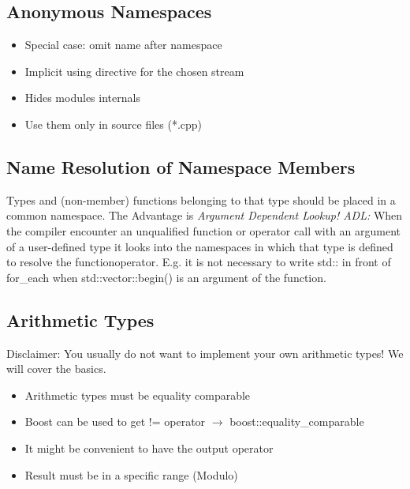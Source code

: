 \subsection{Anonymous Namespaces}
\begin{itemize}
  \itemsep -0.5em 
  \item Special case: omit name after namespace
  \item Implicit using directive for the chosen stream
  \item Hides modules internals
  \item Use them only in source files (*.cpp)
\end{itemize}


\subsection{Name Resolution of Namespace Members}
Types and (non-member) functions belonging to that type should be placed in a common namespace. The Advantage is \textit{Argument Dependent Lookup! ADL:} When the compiler encounter an unqualified function or operator call with an argument of a user-defined type it looks into the namespaces in which that type is defined to resolve the function\/operator. E.g. it is not necessary to write std:: in front of for\_each when std::vector::begin() is an argument of the function.



\subsection{Arithmetic Types}
Disclaimer: You usually do not want to implement your own arithmetic types! We will cover the basics.

\begin{itemize}
	\itemsep -0.5em
    \item Arithmetic types must be equality comparable
    \item Boost can be used to get != operator $\rightarrow$ boost::equality\_comparable
    \item It might be convenient to have the output operator
    \item Result must be in a specific range (Modulo)
\end{itemize}